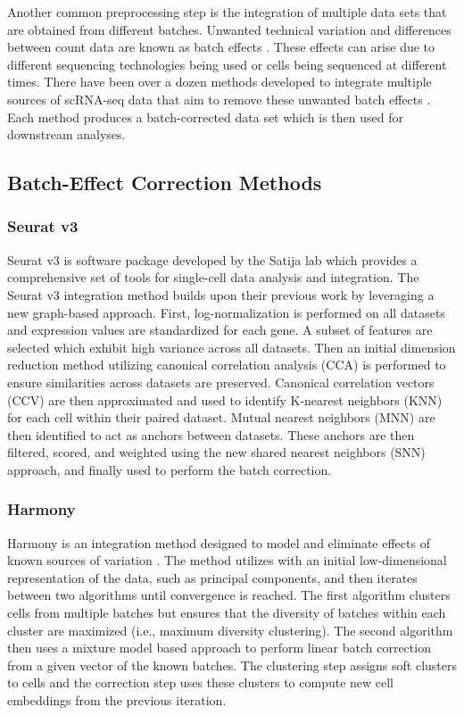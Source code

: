\documentclass[unnumsec,webpdf,contemporary,large]{oup-authoring-template}%
\theoremstyle{thmstyleone}%
\theoremstyle{thmstyletwo}%
\theoremstyle{thmstylethree}%
\begin{document}
Another common preprocessing step is the integration of multiple data sets that are obtained from different batches. Unwanted technical variation and differences between count data are known as batch effects \citep{zhang2020combat}. These effects can arise due to different sequencing technologies being used or cells being sequenced at different times.
There have been over a dozen methods developed to integrate multiple sources of scRNA-seq data that aim to remove these unwanted batch effects \citep{tran2020benchmark}. Each method produces a batch-corrected data set which is then used for downstream analyses.

\subsection{Batch-Effect Correction Methods}

\subsubsection{Seurat v3}

Seurat v3 \citep{stuart2019comprehensive} is software package developed by the Satija lab which provides a comprehensive set of tools for single-cell data analysis and integration. The Seurat v3 integration method builds upon their previous work by leveraging a new graph-based approach. First, log-normalization is performed on all datasets and expression values are standardized for each gene. A subset of features are selected which exhibit high variance across all datasets. Then an initial dimension reduction method utilizing canonical correlation analysis (CCA) is performed to ensure similarities across datasets are preserved. Canonical correlation vectors (CCV) are then approximated and used to identify K-nearest neighbors (KNN) for each cell within their paired dataset. Mutual nearest neighbors (MNN) are then identified to act as anchors between datasets. These anchors are then filtered, scored, and weighted using the new shared nearest neighbors (SNN) approach, and finally used to perform the batch correction.

\subsubsection{Harmony}

Harmony is an integration method designed to model and eliminate effects of known sources of variation \citep{korsunsky2019fast}. The method utilizes with an initial low-dimensional representation of the data, such as principal components, and then iterates between two algorithms until convergence is reached. The first algorithm clusters cells from multiple batches but ensures that the diversity of batches within each cluster are maximized (i.e., maximum diversity clustering). The second algorithm then uses a mixture model based approach to perform linear batch correction from a given vector of the known batches. The clustering step assigns soft clusters to cells and the correction step uses these clusters to compute new cell embeddings from the previous iteration.
\end{document}
